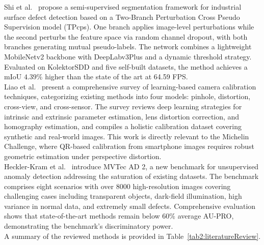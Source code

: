 \documentclass[11pt]{article}
\begin{document}
Shi et al.~\cite{Shi2024SemiSupervised} propose a semi-supervised segmentation
framework for industrial surface defect detection based on a Two-Branch
Perturbation Cross Pseudo Supervision model (TPcps). One branch applies
image-level perturbations while the second perturbs the feature space via random
channel dropout, with both branches generating mutual pseudo-labels. The network
combines a lightweight MobileNetv2 backbone with DeepLabv3Plus and a dynamic
threshold strategy. Evaluated on KolektorSDD and five self-built datasets, the
method achieves a mIoU $4.39\%$ higher than the state of the art at 64.59 FPS.\\

Liao et al.~\cite{Liao2025CameraCalibration} present a comprehensive survey of
learning-based camera calibration techniques, categorizing existing methods into
four models: pinhole, distortion, cross-view, and cross-sensor. The survey
reviews deep learning strategies for intrinsic and extrinsic parameter estimation,
lens distortion correction, and homography estimation, and compiles a holistic
calibration dataset covering synthetic and real-world images. This work is
directly relevant to the Michelin Challenge, where QR-based calibration from
smartphone images requires robust geometric estimation under perspective
distortion.\\

Heckler-Kram et al.~\cite{HecklerKram2025MVTecAD2} introduce MVTec AD 2, a new
benchmark for unsupervised anomaly detection addressing the saturation of existing
datasets. The benchmark comprises eight scenarios with over 8000 high-resolution
images covering challenging cases including transparent objects, dark-field
illumination, high variance in normal data, and extremely small defects.
Comprehensive evaluation shows that state-of-the-art methods remain below $60\%$
average AU-PRO, demonstrating the benchmark's discriminatory power.\\

A summary of the reviewed methods is provided in
Table~\ref{tab2:literatureReview}.
\end{document}
